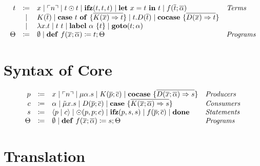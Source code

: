 \documentclass[nonacm]{acmart}
\newcommand{\lit}[1]{\ensuremath{\ulcorner #1 \urcorner}}
\newcommand{\cut}[2]{\ensuremath{\langle #1 \mid #2 \rangle}}
\newcommand{\done}{\ensuremath{\mathbf{done}}}
\newcommand{\ifz}[3]{\ensuremath{\mathbf{ifz}(#1, #2, #3)}}
\newcommand{\letin}[3]{\ensuremath{\mathbf{let}\ #1 = #2\ \mathbf{in}\ #3}}
\newcommand{\caseof}[2]{\ensuremath{\mathbf{case}\ #1\ \mathbf{of}\ \{ #2 \}}}
\newcommand{\case}[1]{\ensuremath{\mathbf{case}\ \{ #1 \}}}
\newcommand{\cocase}[1]{\ensuremath{\mathbf{cocase}\ \{ #1 \}}}
\newcommand{\goto}[2]{\ensuremath{\mathbf{goto}(#1; #2)}}
\newcommand{\lab}[2]{\ensuremath{\mathbf{label}\ #1\ \{#2 \}}}
\newcommand{\defi}[2]{\ensuremath{\mathbf{def}\ #1 \coloneq #2}}
\begin{document}
\begin{definition}
  \[ 
    \begin{array}{r c l l}
      t & \coloneqq & x \mid \lit{n} \mid t \odot t \mid \ifz{t}{t}{t} \mid \letin{x}{t}{t} \mid f(\overline{t}; \overline{\alpha}) & \emph{Terms}\\
      & \mid & K(\overline{t}) \mid \caseof{t}{\overline{K(\overline{x}) \Rightarrow t}} \mid t.D(\overline{t}) \mid \cocase{\overline{D(\overline{x}) \Rightarrow t}} & \\
      & \mid & \lambda x.t \mid t\ t \mid \lab{\alpha}{t} \mid \goto{t}{\alpha} & \\
      \Theta & \coloneqq & \emptyset \mid \defi{f(\overline{x};\overline{\alpha})}{t}; \Theta & \emph{Programs}\\
    \end{array}
  \]
\end{definition}

\section{Syntax of Core}
\label{sec:syntax-of-core}

\begin{definition}
  \[
    \begin{array}{rcll}
      p & \coloneqq & x \mid \lit{n} \mid \mu\alpha.s \mid K(\overline{p}; \overline{c}) \mid \cocase{\overline{D(\overline{x};\overline{\alpha}) \Rightarrow s}} & \emph{Producers}\\
      c & \coloneqq & \alpha \mid \tilde{\mu}x.s \mid D(\overline{p}; \overline{c}) \mid \case{\overline{K(\overline{x}; \overline{\alpha}) \Rightarrow s}}& \emph{Consumers}\\
      s & \coloneqq & \cut{p}{c} \mid \odot(p, p; c) \mid \ifz{p}{s}{s} \mid f(\overline{p}; \overline{c}) \mid \done & \emph{Statements}\\
      \Theta & \coloneqq & \emptyset \mid \defi{f(\overline{x}; \overline{\alpha})}{s}; \Theta & \emph{Programs}\\
    \end{array}
  \]
\end{definition}

\section{Translation}
\label{sec:translation}
\end{document}

